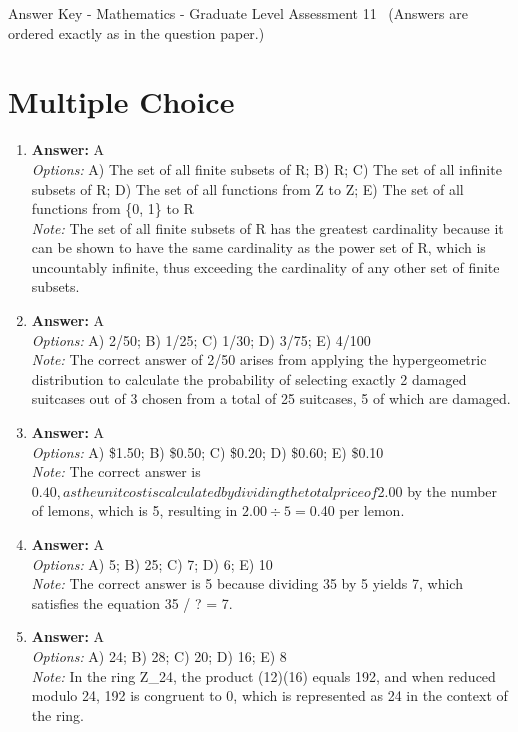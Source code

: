 \documentclass[12pt]{article}
\begin{document}
\begin{center}
Answer Key - Mathematics - Graduate Level Assessment 11 \
\small (Answers are ordered exactly as in the question paper.)
\end{center}

\section*{Multiple Choice}
\begin{enumerate}[label=\arabic*.]
\item \textbf{Answer:} A
\\ \textit{Options:} A) The set of all finite subsets of R; B) R; C) The set of all infinite subsets of R; D) The set of all functions from Z to Z; E) The set of all functions from \{0, 1\} to R
\\ \textit{Note:} The set of all finite subsets of R has the greatest cardinality because it can be shown to have the same cardinality as the power set of R, which is uncountably infinite, thus exceeding the cardinality of any other set of finite subsets.
\item \textbf{Answer:} A
\\ \textit{Options:} A) 2/50; B) 1/25; C) 1/30; D) 3/75; E) 4/100
\\ \textit{Note:} The correct answer of 2/50 arises from applying the hypergeometric distribution to calculate the probability of selecting exactly 2 damaged suitcases out of 3 chosen from a total of 25 suitcases, 5 of which are damaged.
\item \textbf{Answer:} A
\\ \textit{Options:} A) \$1.50; B) \$0.50; C) \$0.20; D) \$0.60; E) \$0.10
\\ \textit{Note:} The correct answer is $0.40, as the unit cost is calculated by dividing the total price of $2.00 by the number of lemons, which is 5, resulting in $2.00 ÷ 5 = $0.40 per lemon.
\item \textbf{Answer:} A
\\ \textit{Options:} A) 5; B) 25; C) 7; D) 6; E) 10
\\ \textit{Note:} The correct answer is 5 because dividing 35 by 5 yields 7, which satisfies the equation 35 / ? = 7.
\item \textbf{Answer:} A
\\ \textit{Options:} A) 24; B) 28; C) 20; D) 16; E) 8
\\ \textit{Note:} In the ring Z\_24, the product (12)(16) equals 192, and when reduced modulo 24, 192 is congruent to 0, which is represented as 24 in the context of the ring.
\end{enumerate}
\end{document}

